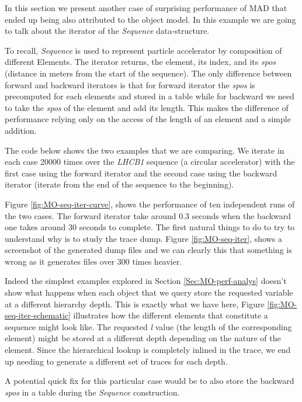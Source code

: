 
In this section we present another case of surprising performance of MAD that
ended up being also attributed to the object model. In this example we are going
to talk about the iterator of the \emph{Sequence} data-structure.

To recall,
\emph{Sequence} is used to represent particle accelerator by composition of
different Elements. The iterator returns, the element, its index, and its \emph{spos}
(distance in meters from the start of the sequence). The
only difference between forward and backward iterators is that for forward iterator
the \emph{spos} is precomputed for each elements and stored in a table while for
backward we need to take the \emph{spos} of the element and add its length. This
makes the difference of performance relying only on the access of the length of
an element and a simple addition.

The code below shows the two examples that we are comparing. We iterate in each
case 20000 times over the \emph{LHCB1} sequence (a circular accelerator) with
the first case using the forward iterator and the second case using the backward
iterator (iterate from the end of the sequence to the beginning).

Figure \ref{fig:MO-seq-iter-curve}, shows the performance of ten independent
runs of the two cases. The forward iterator take around 0.3 seconds when the
backward one takes around 30 seconds to complete. The first natural things to do
to try to understand why is to study the trace dump. Figure \ref{fig:MO-seq-iter},
shows a screenshot of the generated dump files and we can clearly this that
something is wrong as it generates files over 300 times heavier.

Indeed the simplest examples explored in Section \ref{Sec:MO-perf-analys} doesn't
show what happens when each object that we query store the requested variable at
a different hierarchy depth. This is exactly what we have here, Figure
\ref{fig:MO-seq-iter-schematic} illustrates how the different elements that
constitute a sequence might look like. The requested \emph{l} value (the length
of the corresponding element) might be stored at a different depth depending on
the nature of the element. Since the hierarchical lookup is completely inlined
in the trace, we end up needing to generate a different set of traces for each
depth.

A potential quick fix for this particular case would be to also store the
backward \emph{spos} in a table during the \emph{Sequence} construction.

